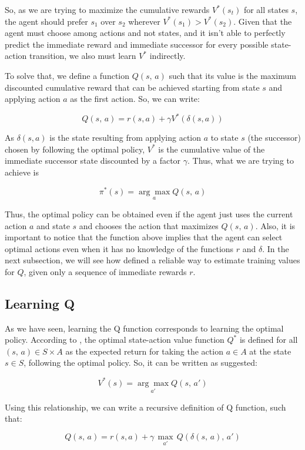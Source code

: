 \documentclass[a4paper]{article}
\begin{document}
So, as we are trying to maximize the cumulative rewards $V^{*}(s_t)$ for all states $s$, the agent should prefer $s_1$ over $s_2$ wherever $V^{*}(s_1) > V^{*}(s_2)$. Given that the agent must choose among actions and not states, and it isn't able to perfectly predict the immediate reward and immediate successor for every possible state-action transition, we also must learn $V^{*}$ indirectly.

To solve that, we define a function $Q(s, \, a)$ such that its value is the maximum discounted cumulative reward that can be achieved starting from state $s$ and applying action $a$ as the first action. So, we can write:

$$Q(s, \, a) = r(s, a) + \gamma V^{*}(\delta(s, a))$$

As $\delta(s, a)$ is the state resulting from applying action $a$ to state $s$ (the successor) chosen by following the optimal policy, $V^{*}$ is the cumulative value of the immediate successor state discounted by a factor $\gamma$. Thus,  what we are trying to achieve is

$$\pi^{*}(s) = \underset{a}{\arg \max} Q(s, \, a)$$

Thus, the optimal policy can be obtained even if the agent just uses the current action $a$ and state $s$ and chooses the action that maximizes $Q(s,\, a)$. Also, it is important to notice that the function above implies that the agent can select optimal actions even when it has no knowledge of the functions $r$ and $\delta$. In the next subsection, we will see how \cite{Mitchell} defined a reliable way to estimate training values for $Q$, given only a sequence of immediate rewards $r$.


\subsection{Learning Q}
As we have seen, learning the Q function corresponds to learning the optimal policy. According to \cite{Mohri_2012}, the optimal state-action value function $Q^{*}$ is defined for all $(s, \, a) \in S \times A$ as the expected return for taking the action $a \in A$ at the state $s \in S$, following the optimal policy. So, it can be written as \cite{Mitchell} suggested:

$$V^{*}(s) = \underset{a'}{\arg \max} Q(s, \, a')$$

Using this relationship, we can write a recursive definition of Q function, such that:

$$Q(s, \, a) = r(s, a) + \gamma \, \underset{a'}{\max} \, Q(\delta(s,\, a), \, a')$$
\end{document}
